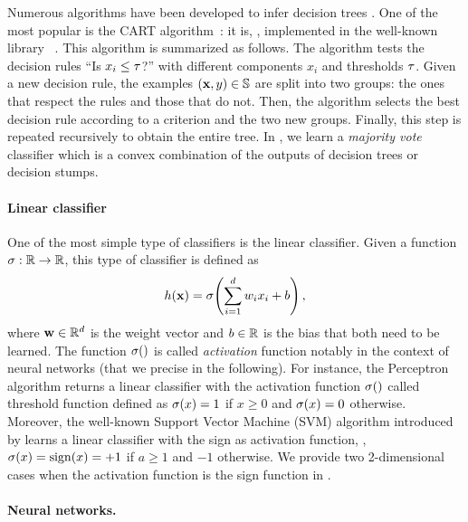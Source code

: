 Numerous algorithms have been developed to infer decision trees \citep[see \eg,][]{BreimanFriedmanOlshenStone1984,Quinlan1986,Quinlan1993}.
One of the most popular is the CART algorithm~\citep{BreimanFriedmanOlshenStone1984}: it is, \eg, implemented in the well-known library \sklearn~\citep{Pedregosa2011}.
This algorithm is summarized as follows. 
The algorithm tests the decision rules ``Is $x_i \le \tau$?'' with different components $x_i$ and thresholds $\tau$.
Given a new decision rule, the examples $(\mathbf{x},y)\in\mathbb{S}$ are split into two groups: the ones that respect the rules and those that do not.
Then, the algorithm selects the best decision rule according to a criterion and the two new groups.
Finally, this step is repeated recursively to obtain the entire tree.
In , we learn a {\it majority vote} classifier which is a convex combination of the outputs of decision trees or decision stumps.

\paragraph{Linear classifier} One of the most simple type of classifiers is the linear classifier. 
Given a function $\sigma: \mathbb{R} \to \mathbb{R}$, this type of classifier is defined as 
\begin{align*}
    h(\mathbf{x}) = \sigma\!\left( \sum_{i=1}^{d}w_ix_i+b\right),
\end{align*}
where $\mathbf{w}\in\mathbb{R}^d$ is the weight vector and $b\in\mathbb{R}$ is the bias that both need to be learned.
The function $\sigma()$ is called {\it activation} function notably in the context of neural networks (that we precise in the following). 
For instance, the Perceptron~\citep{McCullochPitts1943,Rosenblatt1958} algorithm returns a linear classifier with the activation function $\sigma()$ called threshold function defined as $\sigma(x)=1$ if $x\ge 0$ and $\sigma(x)=0$ otherwise.
Moreover, the well-known Support Vector Machine (SVM) algorithm introduced by \citet{BoserGuyonVapnik1992,CortesVapnik1995} learns a linear classifier with the sign as activation function, \ie, $\sigma(x) = \operatorname{sign}(x)=+1$ if $a\ge 1$ and $-1$ otherwise.
We provide two 2-dimensional cases when the activation function is the sign function in .

\paragraph{Neural networks.} 

